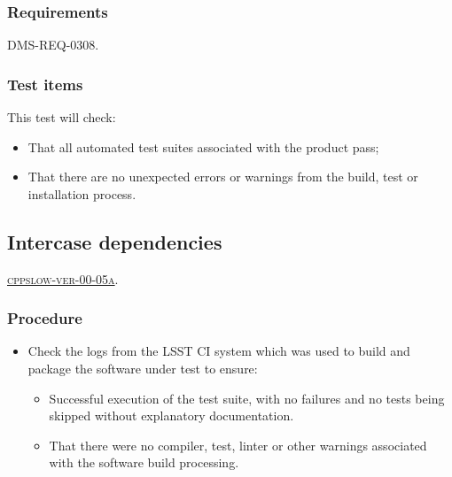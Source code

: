 \documentclass[DM,lsstdraft,STS,toc]{lsstdoc}
\begin{document}
\subsubsection{Requirements}

DMS-REQ-0308.

\subsubsection{Test items}

This test will check:

\begin{itemize}

  \item{That all automated test suites associated with the product pass;}
  \item{That there are no unexpected errors or warnings from the build, test
  or installation process.}

\end{itemize}

\subsection{Intercase dependencies}

\hyperref[cppslow-ver-00-05]{\textsc{cppslow-ver-00-05a}}.

\subsubsection{Procedure}

\begin{itemize}

  \item{Check the logs from the LSST CI system which was used to build and
  package the software under test to ensure:

    \begin{itemize}

      \item{Successful execution of the test suite, with no failures and no
      tests being skipped without explanatory documentation.}

      \item{That there were no compiler, test, linter or other warnings
      associated with the software build processing.}

    \end{itemize}
  }

\end{itemize}
\end{document}
